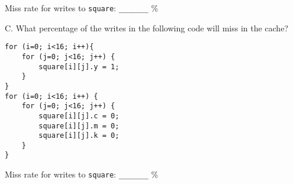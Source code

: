 
\vspace{0.25in}

Miss rate for writes to {\tt square}: \verb|_______| \%

\vspace{0.25in}

C. What percentage of the writes in the following code will miss in the cache?

\begin{verbatim}
for (i=0; i<16; i++){
    for (j=0; j<16; j++) {
        square[i][j].y = 1;
    }
}
for (i=0; i<16; i++) {
    for (j=0; j<16; j++) {
        square[i][j].c = 0;
        square[i][j].m = 0;
        square[i][j].k = 0;
    }
}
\end{verbatim}


\vspace{0.25in}

Miss rate for writes to {\tt square}: \verb|_______| \%
